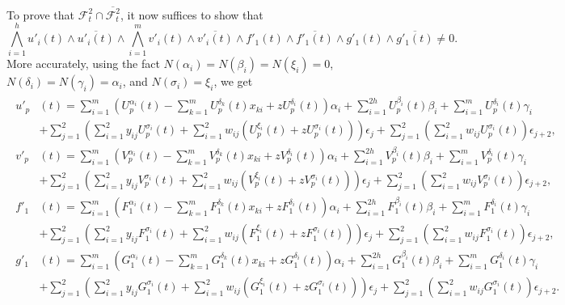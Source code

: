 To prove that \(\mathcal{F}^{2}_{t}\cap 
\overline{\mathcal{F}^{2}_{t}}\), it now suffices to show that 
\begin{equation}
\bigwedge_{i=1}^{h} u'_{i}(t)\wedge\overline{u'_{i}(t)}\wedge
\bigwedge_{i=1}^{m} v'_{i}(t)\wedge\overline{v'_{i}(t)}
\wedge f'_{1}(t)\wedge\overline{f'_{1}(t)}\wedge
g'_{1}(t)\wedge\overline{g'_{1}(t)}\ne 0.
\end{equation}
More accurately, using the fact \(N(\alpha_{i})=N(\beta_{i})=N(\xi_{i})=0\),
\(N(\delta_{i})=N(\gamma_{i})=\alpha_{i}\), 
and \(N(\sigma_{i})=\xi_{i}\),
we get
\begin{align*}
\begin{split}
u'_{p}&(t) = \sum_{i=1}^{m} \left(U^{\alpha_{i}}_{p}(t)-
\sum_{k=1}^{m}U_{p}^{\delta_{k}}(t)x_{ki}+zU_{p}^{\delta_{i}}(t)\right) \alpha_{i}+
\sum_{i=1}^{2h} U^{\beta_{i}}_{p}(t) \beta_{i} + 
\sum_{i=1}^{m} U^{\delta_{i}}_{p}(t) \gamma_{i}\\
&+\sum_{j=1}^{2}\left(\sum_{i=1}^{2}y_{ij}U_{p}^{\sigma_{i}}(t)+
\sum_{i=1}^{2}w_{ij}\left(U_{p}^{\xi_{i}}(t)+zU_{p}^{\sigma_{i}}(t)\right)\right)\epsilon_{j}
+\sum_{j=1}^{2}\left(\sum_{i=1}^{2}w_{ij}U_{p}^{\sigma_{i}}(t)\right)\epsilon_{j+2},\\
v'_{p}&(t) = \sum_{i=1}^{m} \left(V^{\alpha_{i}}_{p}(t)-
\sum_{k=1}^{m}V_{p}^{\delta_{k}}(t)x_{ki}+zV_{p}^{\delta_{i}}(t)\right) \alpha_{i}+
\sum_{i=1}^{2h} V^{\beta_{i}}_{p}(t) \beta_{i} + 
\sum_{i=1}^{m} V^{\delta_{i}}_{p}(t) \gamma_{i}\\
&+\sum_{j=1}^{2}\left(\sum_{i=1}^{2}y_{ij}V_{p}^{\sigma_{i}}(t)+
\sum_{i=1}^{2}w_{ij}\left(V_{p}^{\xi_{i}}(t)+zV_{p}^{\sigma_{i}}(t)\right)\right)\epsilon_{j}
+\sum_{j=1}^{2}\left(\sum_{i=1}^{2}w_{ij}V_{p}^{\sigma_{i}}(t)\right)\epsilon_{j+2},\\
f'_{1}&(t)= \sum_{i=1}^{m} \left(F^{\alpha_{i}}_{1}(t)-
\sum_{k=1}^{m}F_{1}^{\delta_{k}}(t)x_{ki}+zF_{1}^{\delta_{i}}(t)\right) \alpha_{i}+
\sum_{i=1}^{2h} F^{\beta_{i}}_{1}(t) \beta_{i} + 
\sum_{i=1}^{m} F^{\delta_{i}}_{1}(t) \gamma_{i}\\
&+\sum_{j=1}^{2}\left(\sum_{i=1}^{2}y_{ij}F_{1}^{\sigma_{i}}(t)+
\sum_{i=1}^{2}w_{ij}\left(F_{1}^{\xi_{i}}(t)+zF_{1}^{\sigma_{i}}(t)\right)\right)\epsilon_{j}
+\sum_{j=1}^{2}\left(\sum_{i=1}^{2}w_{ij}F_{1}^{\sigma_{i}}(t)\right)\epsilon_{j+2},\\
g'_{1}&(t)= \sum_{i=1}^{m} \left(G^{\alpha_{i}}_{1}(t)-
\sum_{k=1}^{m}G_{1}^{\delta_{k}}(t)x_{ki}+zG_{1}^{\delta_{i}}(t)\right) \alpha_{i}+
\sum_{i=1}^{2h} G^{\beta_{i}}_{1}(t) \beta_{i} + 
\sum_{i=1}^{m} G^{\delta_{i}}_{1}(t) \gamma_{i}\\
&+\sum_{j=1}^{2}\left(\sum_{i=1}^{2}y_{ij}G_{1}^{\sigma_{i}}(t)+
\sum_{i=1}^{2}w_{ij}\left(G_{1}^{\xi_{i}}(t)+zG_{1}^{\sigma_{i}}(t)\right)\right)\epsilon_{j}
+\sum_{j=1}^{2}\left(\sum_{i=1}^{2}w_{ij}G_{1}^{\sigma_{i}}(t)\right)\epsilon_{j+2}.
\end{split}
\end{align*}

